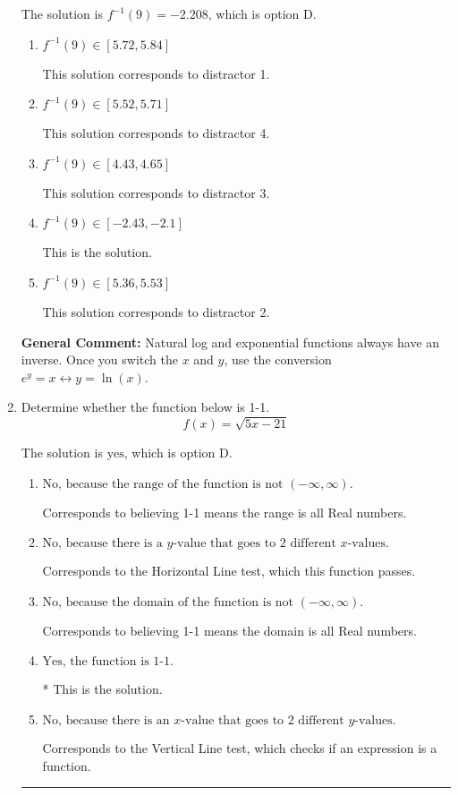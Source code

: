 \documentclass{extbook}[14pt]
\newcommand{\litem}[1]{\item #1

\rule{\textwidth}{0.4pt}}
\begin{document}
\begin{enumerate}
{The solution is \( f^{-1}(9) = -2.208 \), which is option D.\begin{enumerate}[label=\Alph*.]
\item \( f^{-1}(9) \in [5.72, 5.84] \)

 This solution corresponds to distractor 1.
\item \( f^{-1}(9) \in [5.52, 5.71] \)

 This solution corresponds to distractor 4.
\item \( f^{-1}(9) \in [4.43, 4.65] \)

 This solution corresponds to distractor 3.
\item \( f^{-1}(9) \in [-2.43, -2.1] \)

 This is the solution.
\item \( f^{-1}(9) \in [5.36, 5.53] \)

 This solution corresponds to distractor 2.
\end{enumerate}

\textbf{General Comment:} Natural log and exponential functions always have an inverse. Once you switch the $x$ and $y$, use the conversion $ e^y = x \leftrightarrow y=\ln(x)$.
}
\litem{
Determine whether the function below is 1-1.
\[ f(x) = \sqrt{5 x - 21} \]

The solution is \( \text{yes} \), which is option D.\begin{enumerate}[label=\Alph*.]
\item \( \text{No, because the range of the function is not $(-\infty, \infty)$.} \)

Corresponds to believing 1-1 means the range is all Real numbers.
\item \( \text{No, because there is a $y$-value that goes to 2 different $x$-values.} \)

Corresponds to the Horizontal Line test, which this function passes.
\item \( \text{No, because the domain of the function is not $(-\infty, \infty)$.} \)

Corresponds to believing 1-1 means the domain is all Real numbers.
\item \( \text{Yes, the function is 1-1.} \)

* This is the solution.
\item \( \text{No, because there is an $x$-value that goes to 2 different $y$-values.} \)

Corresponds to the Vertical Line test, which checks if an expression is a function.
\end{enumerate}

}
\end{enumerate}
\end{document}
